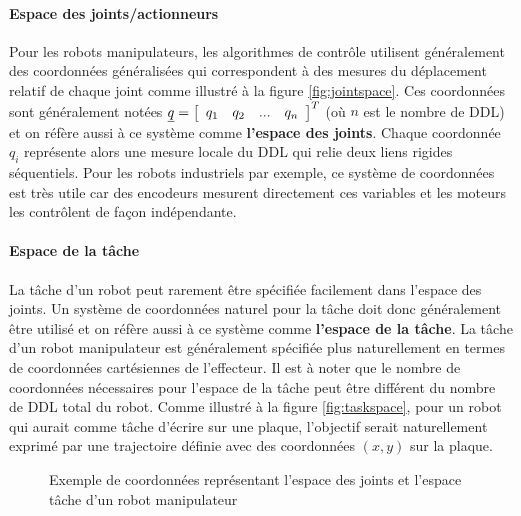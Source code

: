 \paragraph{Espace des joints/actionneurs}

Pour les robots manipulateurs, les algorithmes de contrôle utilisent généralement des coordonnées généralisées qui correspondent à des mesures du déplacement relatif de chaque joint comme illustré à la figure \ref{fig:jointspace}. Ces coordonnées sont généralement notées $\underline{q} = \left[ \begin{array}{cccc} q_1 & q_2 & ... & q_n \end{array} \right]^T$ (où $n$ est le nombre de DDL) et on réfère aussi à ce système comme \textbf{l'espace des joints}. Chaque coordonnée $q_i$ représente alors une mesure locale du DDL qui relie deux liens rigides séquentiels. Pour les robots industriels par exemple, ce système de coordonnées est très utile car des encodeurs mesurent directement ces variables et les moteurs les contrôlent de façon indépendante. 

\paragraph{Espace de la tâche}

La tâche d'un robot peut rarement être spécifiée facilement dans l'espace des joints. Un système de coordonnées naturel pour la tâche doit donc généralement être utilisé et on réfère aussi à ce système comme \textbf{l'espace de la tâche}. La tâche d'un robot manipulateur est généralement spécifiée plus naturellement en termes de coordonnées cartésiennes de l'effecteur. Il est à noter que le nombre de coordonnées nécessaires pour l'espace de la tâche peut être différent du nombre de DDL total du robot. Comme illustré à la figure \ref{fig:taskspace}, pour un robot qui aurait comme tâche d'écrire sur une plaque, l'objectif serait naturellement exprimé par une trajectoire définie avec des coordonnées $(x,y)$ sur la plaque. 

\begin{figure}[htbp]
        \centering
				\hspace{+20pt}
        \caption{Exemple de coordonnées représentant l'espace des joints et l'espace tâche d'un robot manipulateur}
				\label{fig:spaces}
\end{figure}


